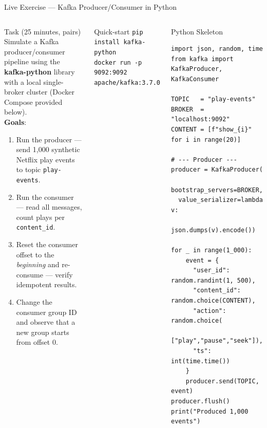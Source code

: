 \documentclass[aspectratio=169,10pt]{beamer}
\begin{document}
\begin{frame}[fragile]{Live Exercise — Kafka Producer/Consumer in Python}
  \begin{columns}[T]
      \begin{block}{Task (25 minutes, pairs)}
        Simulate a Kafka producer/consumer pipeline using the
        \textbf{kafka-python} library with a local single-broker
        cluster (Docker Compose provided below).\\[5pt]
        \textbf{Goals}:
        \begin{enumerate}\setlength\itemsep{1pt}
          \item Run the producer — send 1{,}000 synthetic
                Netflix play events to topic \texttt{play-events}.
          \item Run the consumer — read all messages,
                count plays per \texttt{content\_id}.
          \item Reset the consumer offset to the \emph{beginning}
                and re-consume — verify idempotent results.
          \item Change the consumer group ID and observe that
                a new group starts from offset 0.
        \end{enumerate}
      \end{block}
      \vspace{4pt}
      \begin{exampleblock}{Quick-start}
        \scriptsize\texttt{pip install kafka-python}\\
        \scriptsize\texttt{docker run -p 9092:9092 apache/kafka:3.7.0}
      \end{exampleblock}

      \begin{exampleblock}{Python Skeleton}
        \scriptsize
        \begin{verbatim}
import json, random, time
from kafka import KafkaProducer, KafkaConsumer

TOPIC   = "play-events"
BROKER  = "localhost:9092"
CONTENT = [f"show_{i}" for i in range(20)]

# --- Producer ---
producer = KafkaProducer(
  bootstrap_servers=BROKER,
  value_serializer=lambda v:
      json.dumps(v).encode())

for _ in range(1_000):
    event = {
      "user_id":    random.randint(1, 500),
      "content_id": random.choice(CONTENT),
      "action":     random.choice(
                      ["play","pause","seek"]),
      "ts":         int(time.time())
    }
    producer.send(TOPIC, event)
producer.flush()
print("Produced 1,000 events")


\end{verbatim}
\end{exampleblock}
\end{columns}
\end{frame}
\end{document}
